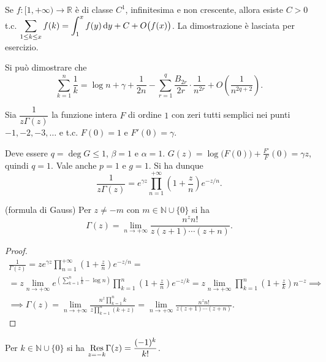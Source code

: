 \begin{oss}
  Se $f:[1,+\infty) \longrightarrow \mathbb{R}$ è di classe $C^1$, infinitesima e non crescente, allora esiste $C>0$ t.c. $\displaystyle \sum_{1 \le k \le x} f(k)=\int_1^x f(y)\mathop{}\!\mathrm{d} y+C+O\big(f(x)\big)$. La dimostrazione è lasciata per esercizio.
\end{oss}

\begin{oss}
  Si può dimostrare che
  $$\sum_{k=1}^n \frac{1}{k}=\log{n}+\gamma+\frac{1}{2n}-\sum_{r=1}^q \frac{B_{2r}}{2r}\cdot\frac{1}{n^{2r}}+O\left(\frac{1}{n^{2q+2}}\right).$$
\end{oss}

\begin{defn}
  Sia $\dfrac{1}{z\Gamma(z)}$ la funzione intera $F$ di ordine $1$ con zeri tutti semplici nei punti $-1,-2,-3,\dots$ e t.c. $F(0)=1$ e $F'(0)=\gamma$.
\end{defn}

Deve essere $q=\deg{G} \le 1$, $\beta=1$ e $\alpha=1$. $G(z)=\log\big(F(0)\big)+\frac{F'}{F}(0)=\gamma z$, quindi $q=1$. Vale anche $p=1$ e $g=1$. Si ha dunque
$$\frac{1}{z\Gamma(z)}=e^{\gamma z}\prod_{n=1}^{+\infty}\left(1+\frac{z}{n}\right)e^{-z/n}.$$

\begin{prop}
  (formula di Gauss) Per $z\not=-m$ con $m \in \mathbb{N}\cup\{0\}$ si ha
  \begin{equation}
    \Gamma(z)=\lim_{n \longrightarrow +\infty} \frac{n^zn!}{z(z+1)\cdots(z+n)}.
  \end{equation}
\end{prop}

\begin{proof}
  \begin{gather*}
    \frac{1}{\Gamma(z)}=ze^{\gamma z}\prod_{n=1}^{+\infty}\left(1+\frac{z}{n}\right)e^{-z/n}=\\
    =z\lim_{n \longrightarrow +\infty} e^{\left(\sum_{k=1}^n\frac{1}{k}-\log{n}\right)}\prod_{k=1}^n\left(1+\frac{z}{n}\right)e^{-z/k}=z\lim_{n \longrightarrow +\infty} \prod_{k=1}^n\left(1+\frac{z}{k}\right)n^{-z} \implies \\
    \implies \Gamma(z)=\lim_{n \longrightarrow +\infty} \frac{n^z\prod_{k=1}^n k}{z\prod_{k=1}^n (k+z)}=\lim_{n \longrightarrow +\infty} \frac{n^zn!}{z(z+1)\cdots(z+n)}.
  \end{gather*}
\end{proof}

\begin{prop}
  Per $k \in \mathbb{N}\cup\{0\}$ si ha $\underset{z=-k}{\normalfont{\text{Res}}}\Gamma(z)=\dfrac{(-1)^k}{k!}$.
\end{prop}


